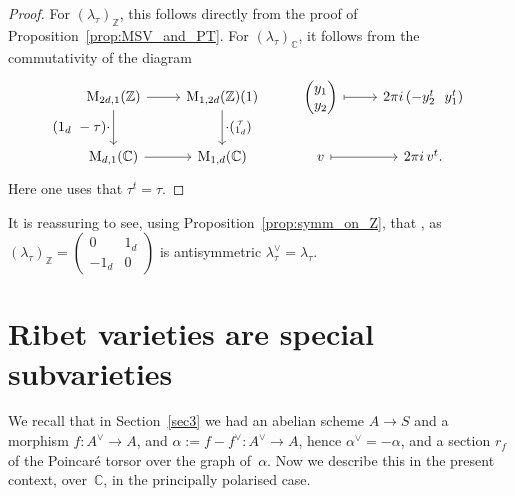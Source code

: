 \documentclass[11pt]{article}
\providecommand{\C}{}
\let\oldvee\vee
\renewcommand{\vee}{{\scriptscriptstyle\oldvee}}
\theoremstyle{plain}
\theoremstyle{definition}
\numberwithin{equation}{subsection}
\renewcommand{\C}{\mathbb C}
\newcommand{\Z}{\mathbb Z}
\newcommand{\rmM}{\mathrm{M}}
\begin{document}
\begin{proof}
For $(\lambda_\tau)_\Z$, this follows directly from the proof of
Proposition~\ref{prop:MSV_and_PT}. For $(\lambda_\tau)_\C$, it follows
from the commutativity of the diagram
\[
\begin{tikzcd}
\rmM_{2d,1}(\Z) \ar[r] \ar[d, "\textstyle(1_d\ -\tau){\cdot}"'] &
\rmM_{1,2d}(\Z)(1) \ar[d, "\textstyle{\cdot}(\substack{\tau\\ 1_d})"] &
\begin{pmatrix} y_1\\ y_2\end{pmatrix} \ar[r, mapsto]& 2\pi i\, (-y_2^t \ \ y_1^t)\\
\rmM_{d,1}(\C) \ar[r] & \rmM_{1,d}(\C) & v\ar[r, mapsto] & 2\pi i\, v^t.
\end{tikzcd}
\]
Here one uses that $\tau^t=\tau$.
\end{proof}
It is reassuring to see, using Proposition~\ref{prop:symm_on_Z}, that , as
$(\lambda_\tau)_\Z=(\begin{smallmatrix}0 & 1_d\\-1_d &
0\end{smallmatrix})$ is antisymmetric
$\lambda_\tau^\vee=\lambda_\tau$.

\section{Ribet varieties are special subvarieties}\label{sec5}
We recall that in Section~\ref{sec3} we had an abelian scheme $A\to S$
and a morphism $f\colon A^\vee\to A$, and $\alpha:=f-f^\vee\colon
A^\vee\to A$, hence $\alpha^\vee=-\alpha$, and a section $r_f$ of the
Poincaré torsor over the graph of~$\alpha$. Now we describe this in
the present context, over~$\C$, in the principally polarised case.
\end{document}
